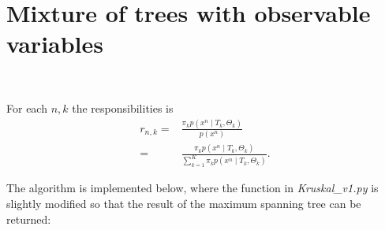 \documentclass[11pt]{extarticle}
\newcommand{\0}{\mathbf{0}}
\renewcommand{\(}{\left(}
\renewcommand{\)}{\right)}
\theoremstyle{definition}
\begin{document}
\section{Mixture of trees with observable variables}
\noindent{} \\
\par For each $n,k$ the responsibilities is
\begin{align*}
	r_{n,k} =& \frac{\pi_{k}p(x^{n} \mid T_{k}, \Theta_{k})}{p(x^{n})} \\
	=& \frac{\pi_{k}p(x^{n} \mid T_{k}, \Theta_{k})}{\sum_{k=1}^{K} \pi_{k}p(x^{n} \mid T_{k}, \Theta_{k})}.
\end{align*}
\par The algorithm is implemented below, where the function in \textit{Kruskal\_v1.py} is slightly modified so that the result of the maximum spanning tree can be returned:

\end{document}
